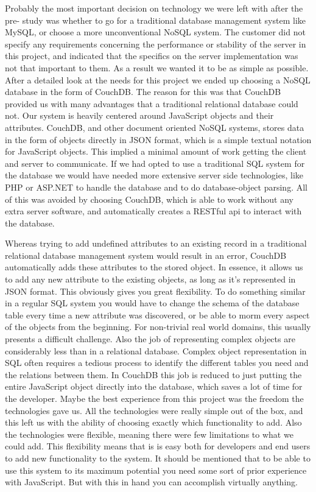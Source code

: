 Probably the most important decision on technology we were left with after the pre- study was whether to go for a traditional database management system like MySQL, or choose a more unconventional NoSQL system. The customer did not specify any requirements concerning the performance or stability of the server in this project, and indicated that the specifics on the server implementation was not that important to them. As a result we wanted it to be as simple as possible. After a detailed look at the needs for this project we ended up choosing a NoSQL database in the form of CouchDB. The reason for this was that CouchDB provided us with many advantages that a traditional relational database could not. Our system is heavily centered around JavaScript objects and their attributes. CouchDB, and other document oriented NoSQL systems, stores data in the form of objects directly in JSON format, which is a simple textual notation for JavaScript objects. This implied a minimal amount of work getting the client and server to communicate. If we had opted to use a traditional SQL system for the database we would have needed more extensive server side technologies, like PHP or ASP.NET to handle the database and to do database-object parsing. All of this was avoided by choosing CouchDB, which is able to work without any extra server software, and automatically creates a RESTful api to interact with the database.

Whereas trying to add undefined attributes to an existing record in a traditional relational database management system would result in an error, CouchDB automatically adds these attributes to the stored object. In essence, it allows us to add any new attribute to the existing objects, as long as it's represented in JSON format. This obviously gives you great flexibility. To do something similar in a regular SQL system you would have to change the schema of the database table every time a new attribute was discovered, or be able to morm every aspect of the objects from the beginning. For non-trivial real world domains, this usually presents a difficult challenge. Also the job of representing complex objects are considerably less than in a relational database. Complex object representation in SQL often requires a tedious process to identify the different tables you need and the relations between them. In CouchDB this job is reduced to just putting the entire JavaScript object directly into the database, which saves a lot of time for the developer. Maybe the best experience from this project was the freedom the technologies gave us. All the technologies were really simple out of the box, and this left us with the ability of choosing exactly which functionality to add. Also the technologies were flexible, meaning there were few limitations to what we could add. This flexibility means that is is easy both for developers and end users to add new functionality to the system. It should be mentioned that to be able to use this system to its maximum potential you need some sort of prior experience with JavaScript. But with this in hand you can accomplish virtually anything.


